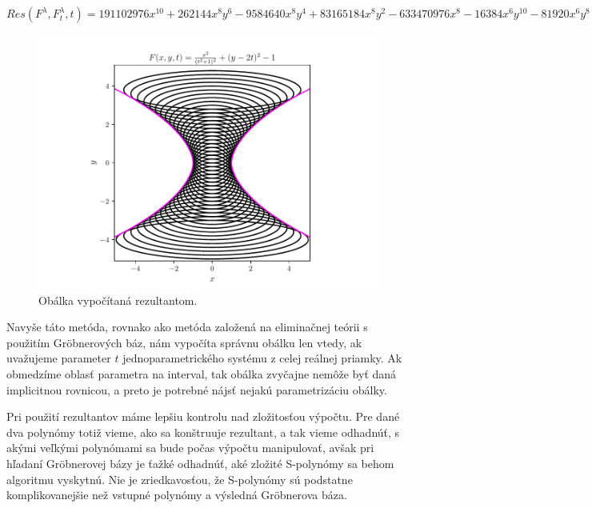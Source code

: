 $ Res(F^\lambda , F_t^\lambda , t) = 191102976x^{10} + 262144x^8y^6 - 9584640x^8y^4 + 83165184x^8y^2 - 633470976x^8 - 16384x^6y^{10} - 81920x^6y^8 - 14483456x^6y^6 - 113311744x^6y^4 + 96419840x^6y^2 + 698368000x^6 - 16384x^4y^{12} - 294912x^4y^{10} - 2998272x^4y^8 - 18284544x^4y^6 - 74956800x^4y^4 - 184320000x^4y^2 - 256000000x^4. $

\begin{figure}[H]
	\centering
	\includegraphics[trim={0 0.35cm 0 0.85cm},clip]{images/resultant.pdf}
	\caption{Obálka vypočítaná rezultantom.}
	\label{fig:resultant}
\end{figure}

Navyše táto metóda, rovnako ako metóda založená na eliminačnej teórii s použitím Gröbnerových báz, nám vypočíta správnu obálku len vtedy, ak uvažujeme parameter $t$ jednoparametrického systému z celej reálnej priamky. Ak obmedzíme oblasť parametra na interval, tak obálka zvyčajne nemôže byť daná implicitnou rovnicou, a preto je potrebné nájsť nejakú parametrizáciu obálky. 

Pri použití rezultantov máme lepšiu kontrolu nad zložitosťou výpočtu. Pre dané dva polynómy totiž vieme, ako sa konštruuje rezultant, a tak vieme odhadnúť, s akými veľkými polynómami sa bude počas výpočtu manipulovať, avšak pri hľadaní Gröbnerovej bázy je ťažké odhadnúť, aké zložité S-polynómy sa behom algoritmu vyskytnú. Nie je zriedkavosťou, že S-polynómy sú podstatne komplikovanejšie než vstupné polynómy a výsledná Gröbnerova báza.

